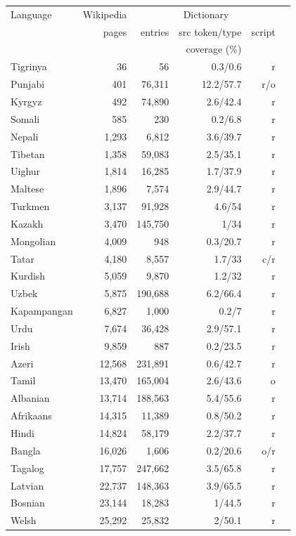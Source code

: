 \documentclass{article}
\begin{document}
\begin{table}[h!]
\footnotesize
\begin{center}
\begin{tabular}{lrrrrr}
Language		&	Wikipedia	&	\multicolumn{3}{c}{Dictionary}\\
\cline{3-5}
	&	pages	&	entries	&	src token/type	&	script \\
	&	&	&	coverage (\%) \\
\hline
Tigrinya	&	36	&	56	&	0.3/0.6	&	r\\
Punjabi 	&	401	&	76,311	&	12.2/57.7	&	r/o\\ 	
Kyrgyz	&	492	&	74,890	&	2.6/42.4	&	r\\
Somali 	&	585	&	230	&	0.2/6.8	&	r\\ 	
Nepali 	&	1,293	&	6,812	&	3.6/39.7	&	r\\
Tibetan	&	1,358	&	59,083	&	2.5/35.1	&	r\\
Uighur	&	1,814	&	16,285	&	1.7/37.9	&	r\\
Maltese 	&	1,896	&	7,574	&	2.9/44.7	&	r\\
Turkmen	&	3,137	&	91,928	&	4.6/54	&	r\\
Kazakh 	&	3,470	&	145,750	&	1/34	&	r\\
Mongolian 	&	4,009	&	948	&	0.3/20.7	&	r\\
Tatar		&	4,180	& 8,557	&	1.7/33	&	c/r\\
Kurdish	&	5,059	&	9,870	&	1.2/32	&	r\\
Uzbek 	&	5,875	&	190,688	&	6.2/66.4	&	r\\
Kapampangan	&	6,827	&	1,000	&	0.2/7	&	r\\
Urdu 	&	7,674	&	36,428	&	2.9/57.1	&	r\\
Irish	&	9,859	&	887&	0.2/23.5	&	r\\
Azeri	&	12,568	&	231,891&	0.6/42.7	&	r\\
Tamil	&	13,470	&	165,004	&	2.6/43.6	&	o\\
Albanian 	&	13,714	&	188,563	&	5.4/55.6	&	r\\
Afrikaans	&	14,315	&	11,389	&	0.8/50.2	&	r\\
Hindi 	&	14,824	&	58,179	&	2.2/37.7	&	r\\
Bangla 	&	16,026	&	1,606	&	0.2/20.6	&	o/r\\
Tagalog	&	17,757	&	247,662	&	3.5/65.8	&	r\\
Latvian	&	22,737	&	148,363	&	3.9/65.5	&	r\\
Bosnian 	&	23,144	&	18,283	&	1/44.5	&	r\\
Welsh	&	25,292	&	25,832	&	2/50.1	&	r\\

\end{tabular}
\end{center}
\end{table}
\end{document}
